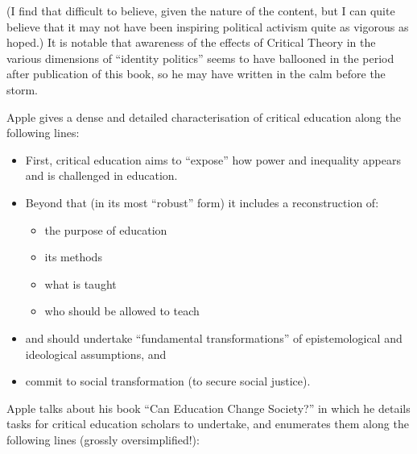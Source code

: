 \documentclass[10pt,titlepage]{book}
\begin{document}
(I find that difficult to believe, given the nature of the content, but I can quite believe that it may not have been inspiring political activism quite as vigorous as hoped.)
It is notable that awareness of the effects of Critical Theory in the various dimensions of ``identity politics'' seems to have ballooned in the period after publication of this book, so he may have written in the calm before the storm.

Apple gives a dense and detailed characterisation of critical education along the following lines:

\begin{itemize}
\item First, critical education aims to ``expose'' how power and inequality appears and is challenged in education.
\item Beyond that (in its most ``robust'' form) it includes a reconstruction of:
  \begin{itemize}
  \item the purpose of education
  \item its methods
  \item what is taught
  \item who should be allowed to teach
  \end{itemize}
\item and should undertake ``fundamental transformations'' of epistemological and ideological assumptions, and
  \item commit to social transformation (to secure social justice).
\end{itemize}

Apple talks about his book ``Can Education Change Society?'' in which he details tasks for critical education scholars to undertake, and enumerates them along the following lines (grossly oversimplified!):
\end{document}
